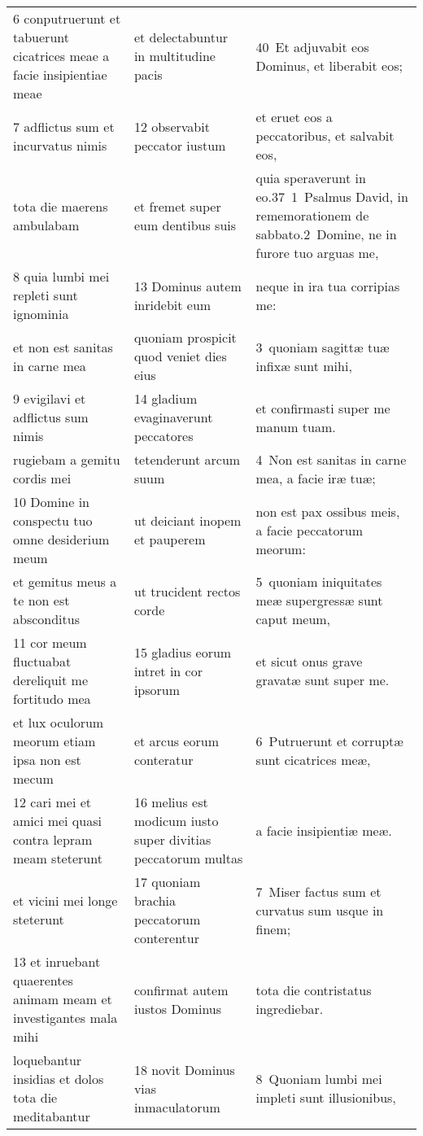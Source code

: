 \documentclass{article}
\begin{document}
\begin{longtable}{@{}p{}p{}p{}@{}}
6 conputruerunt et tabuerunt cicatrices meae a facie insipientiae meae	&	et delectabuntur in multitudine pacis	&	40 Et adjuvabit eos Dominus, et liberabit eos;	\\
7 adflictus sum et incurvatus nimis	&	12 observabit peccator iustum	&	et eruet eos a peccatoribus, et salvabit eos,	\\
tota die maerens ambulabam	&	et fremet super eum dentibus suis	&	quia speraverunt in eo.37 1 Psalmus David, in rememorationem de sabbato.2 Domine, ne in furore tuo arguas me,	\\
8 quia lumbi mei repleti sunt ignominia	&	13 Dominus autem inridebit eum	&	neque in ira tua corripias me:	\\
et non est sanitas in carne mea	&	quoniam prospicit quod veniet dies eius	&	3 quoniam sagittæ tuæ infixæ sunt mihi,	\\
9 evigilavi et adflictus sum nimis	&	14 gladium evaginaverunt peccatores	&	et confirmasti super me manum tuam.	\\
rugiebam a gemitu cordis mei	&	tetenderunt arcum suum	&	4 Non est sanitas in carne mea, a facie iræ tuæ;	\\
10 Domine in conspectu tuo omne desiderium meum	&	ut deiciant inopem et pauperem	&	non est pax ossibus meis, a facie peccatorum meorum:	\\
et gemitus meus a te non est absconditus	&	ut trucident rectos corde	&	5 quoniam iniquitates meæ supergressæ sunt caput meum,	\\
11 cor meum fluctuabat dereliquit me fortitudo mea	&	15 gladius eorum intret in cor ipsorum	&	et sicut onus grave gravatæ sunt super me.	\\
et lux oculorum meorum etiam ipsa non est mecum	&	et arcus eorum conteratur	&	6 Putruerunt et corruptæ sunt cicatrices meæ,	\\
12 cari mei et amici mei quasi contra lepram meam steterunt	&	16 melius est modicum iusto super divitias peccatorum multas	&	a facie insipientiæ meæ.	\\
et vicini mei longe steterunt	&	17 quoniam brachia peccatorum conterentur	&	7 Miser factus sum et curvatus sum usque in finem;	\\
13 et inruebant quaerentes animam meam et investigantes mala mihi	&	confirmat autem iustos Dominus	&	tota die contristatus ingrediebar.	\\
loquebantur insidias et dolos tota die meditabantur	&	18 novit Dominus vias inmaculatorum	&	8 Quoniam lumbi mei impleti sunt illusionibus,	\\

\end{longtable}
\end{document}
